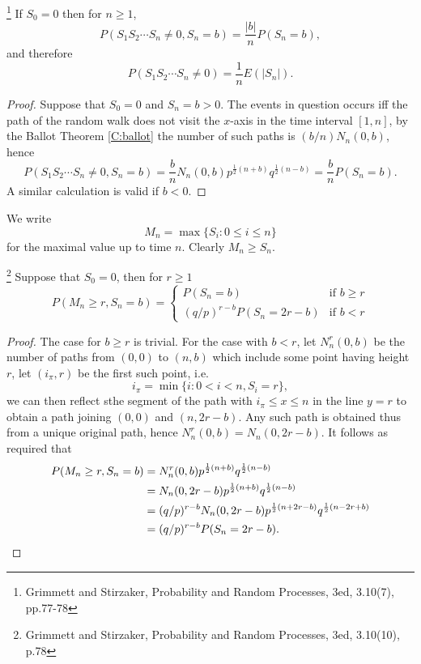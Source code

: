 \begin{theorem} \label{T:rw_ballot2}
\footnote{Grimmett and Stirzaker, Probability and Random Processes, 3ed, 
          3.10(7), pp.77-78}
If $S_0=0$ then for $n\ge 1$,
\begin{equation}
  P(S_1 S_2\cdots S_n\neq 0, S_n=b) = \frac{|b|}{n} P(S_n=b),
\end{equation}
and therefore
\begin{equation}
  P(S_1 S_2\cdots S_n\neq 0) = \frac{1}{n} E(|S_n|).
\end{equation}
\end{theorem}
\begin{proof}
Suppose that $S_0=0$ and $S_n=b>0$. The events in question occurs iff the
path of the random walk does not visit the $x$-axis in the time interval
$[1,n]$, by the Ballot Theorem \ref{C:ballot} the number of such paths
is $(b/n)N_n(0,b)$, hence 
\[
  P(S_1 S_2\cdots S_n\neq 0, S_n=b) 
    = \frac{b}{n} N_n(0,b) p^{\frac{1}{2}(n+b)} q^{\frac{1}{2}(n-b)}
    = \frac{b}{n} P(S_n=b).
\]
A similar calculation is valid if $b<0$.
\end{proof}

We write
\[
  M_n = \max \{S_i: 0\le i\le n \}
\]
for the maximal value up to time $n$. Clearly $M_n\ge S_n$. 

\begin{theorem}  \label{T:rw_max}
\footnote{Grimmett and Stirzaker, Probability and Random Processes, 3ed, 
          3.10(10), p.78}
Suppose that $S_0=0$, then for $r\ge 1$
\begin{equation}
  P(M_n\ge r, S_n=b) =
    \begin{cases}
      P(S_n=b)                 &\text{if $b\ge r$}   \\
      (q/p)^{r-b} P(S_n=2r-b)  &\text{if $b<r$}
    \end{cases}
\end{equation}
\end{theorem}
\begin{proof}
The case for $b\ge r$ is trivial. For the case with $b<r$, let $N_n^r(0,b)$ be
the number of paths from $(0,0)$ to $(n,b)$ which include some point having 
height $r$, let $(i_{\pi},r)$ be the first such point, i.e.
\[
  i_{\pi} = \min \{i: 0<i<n, S_i=r \},
\]
we can then reflect sthe segment of the path with $i_{\pi}\le x\le n$ in the 
line $y=r$ to obtain a path joining $(0,0)$ and $(n,2r-b)$. Any such path
is obtained thus from a unique original path, hence $N_n^r(0,b)=N_n(0,2r-b)$.
It follows as required that
\begin{align*}
  P(M_n\ge r, S_n=b) 
    &= N_n^r(0,b) p^{\frac{1}{2}(n+b)} q^{\frac{1}{2}(n-b)} \notag \\
    &= N_n(0,2r-b) p^{\frac{1}{2}(n+b)} q^{\frac{1}{2}(n-b)} \notag \\
    &= (q/p)^{r-b} N_n(0,2r-b) p^{\frac{1}{2}(n+2r-b)} q^{\frac{1}{2}(n-2r+b)}
        \notag \\
    &= (q/p)^{r-b} P(S_n=2r-b). 
\end{align*}
\end{proof}

